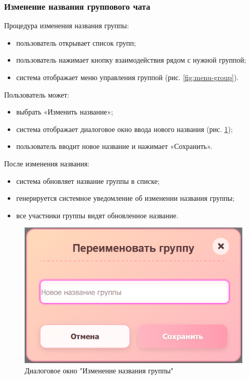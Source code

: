 \subsubsection{Изменение названия группового чата}  
Процедура изменения названия группы:
\begin{itemize}
	\item пользователь открывает список групп;
	\item пользователь нажимает кнопку взаимодействия рядом с нужной группой;
	\item система отображает меню управления группой (рис. \ref{fig:menu-group}).
\end{itemize}

Пользователь может:
\begin{itemize}
	\item выбрать «Изменить название»;
	\item система отображает диалоговое окно ввода нового названия (рис. \ref{fig:group-rename});
	\item пользователь вводит новое название и нажимает «Сохранить».
\end{itemize}

После изменения названия:
\begin{itemize}
	\item система обновляет название группы в списке;
	\item генерируется системное уведомление об изменении названия группы;
	\item все участники группы видят обновленное название.
\end{itemize}

\begin{figure}[H]
	\centering
	\includegraphics[width=0.8\linewidth]{"images/Окно переименования группы"}
	\caption{Диалоговое окно "Изменение названия группы"}
	\label{fig:group-rename}
\end{figure}

